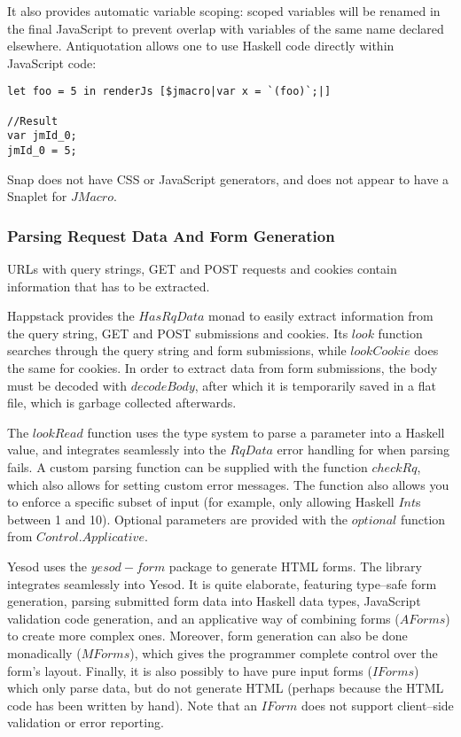 It also provides automatic variable scoping: scoped variables will be renamed in the final JavaScript to prevent overlap with variables of the same name declared elsewhere.
Antiquotation allows one to use Haskell code directly within JavaScript code:

\begin{lstlisting}
let foo = 5 in renderJs [$jmacro|var x = `(foo)`;|]

//Result
var jmId_0;
jmId_0 = 5;
\end{lstlisting}

Snap does not have CSS or JavaScript generators, and does not appear to have a Snaplet for $ JMacro $.

\subsubsection{Parsing Request Data And Form Generation}
URLs with query strings, GET and POST requests and cookies contain information that has to be extracted.

Happstack provides the $ HasRqData $ monad to easily extract information from the query string, GET and POST submissions and cookies.
Its $ look $ function searches through the query string and form submissions, while $ lookCookie $ does the same for cookies.
In order to extract data from form submissions, the body must be decoded with $ decodeBody $, after which it is temporarily saved in a flat file, which is garbage collected afterwards.

The $ lookRead $ function uses the type system to parse a parameter into a Haskell value, and integrates seamlessly into the $ RqData $ error handling for when parsing fails.
A custom parsing function can be supplied with the function $ checkRq $, which also allows for setting custom error messages.
The function also allows you to enforce a specific subset of input (for example, only allowing Haskell $ Int $s between 1 and 10).
Optional parameters are provided with the $ optional $ function from $ Control.Applicative $.

Yesod uses the $ yesod-form $ package to generate HTML forms. The library integrates seamlessly into Yesod.
It is quite elaborate, featuring type--safe form generation, parsing submitted form data into Haskell data types, JavaScript validation code generation, and an applicative way of combining forms ($ AForms $) to create more complex ones.
Moreover, form generation can also be done monadically ($ MForms $), which gives the programmer complete control over the form's layout.
Finally, it is also possibly to have pure input forms ($ IForms $) which only parse data, but do not generate HTML (perhaps because the HTML code has been written by hand). 
Note that an $ IForm $ does not support client--side validation or error reporting.

